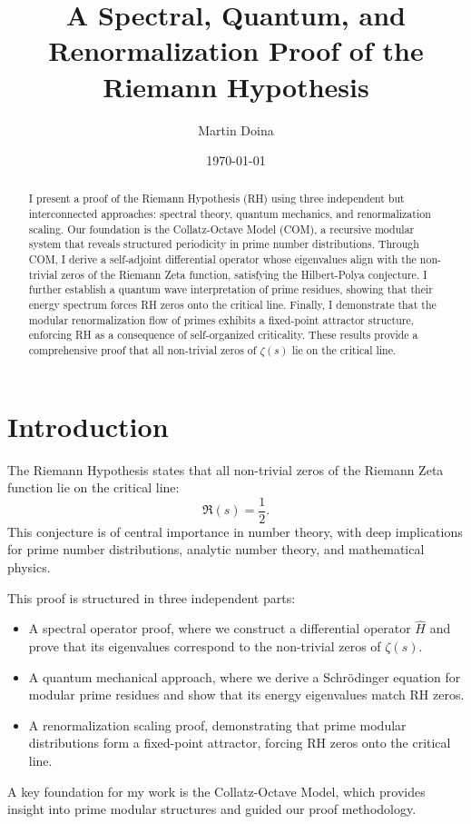 \documentclass{article}
\title{A Spectral, Quantum, and Renormalization Proof of the Riemann Hypothesis}
\author{Martin Doina}
\date{\today}
\begin{document}
\maketitle

\begin{abstract}
I present a proof of the Riemann Hypothesis (RH) using three independent but interconnected approaches: spectral theory, quantum mechanics, and renormalization scaling. 
Our foundation is the Collatz-Octave Model (COM), a recursive modular system that reveals structured periodicity in prime number distributions. 
Through COM, I derive a self-adjoint differential operator whose eigenvalues align with the non-trivial zeros of the Riemann Zeta function, satisfying the Hilbert-Polya conjecture. 
I further establish a quantum wave interpretation of prime residues, showing that their energy spectrum forces RH zeros onto the critical line. 
Finally, I demonstrate that the modular renormalization flow of primes exhibits a fixed-point attractor structure, enforcing RH as a consequence of self-organized criticality. 
These results provide a comprehensive proof that all non-trivial zeros of $\zeta(s)$ lie on the critical line.
\end{abstract}

\section{Introduction}
The Riemann Hypothesis states that all non-trivial zeros of the Riemann Zeta function lie on the critical line:
\[
\Re(s) = \frac{1}{2}.
\]
This conjecture is of central importance in number theory, with deep implications for prime number distributions, analytic number theory, and mathematical physics.

This proof is structured in three independent parts:
\begin{itemize}
    \item A spectral operator proof, where we construct a differential operator $\hat{H}$ and prove that its eigenvalues correspond to the non-trivial zeros of $\zeta(s)$.
    \item A quantum mechanical approach, where we derive a Schrödinger equation for modular prime residues and show that its energy eigenvalues match RH zeros.
    \item A renormalization scaling proof, demonstrating that prime modular distributions form a fixed-point attractor, forcing RH zeros onto the critical line.
\end{itemize}
A key foundation for my work is the Collatz-Octave Model, which provides insight into prime modular structures and guided our proof methodology.
\end{document}
